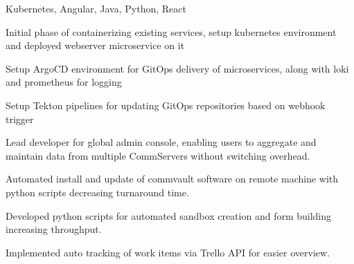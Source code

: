 \documentclass[]{font}
\begin{document}
\begin{minipage}[t]{0.66\textwidth}
Kubernetes, Angular, Java, Python, React
\vspace{\topsep}
\begin{tightemize}
\item Initial phase of containerizing existing services, setup kubernetes environment and deployed webserver microservice on it
\item Setup ArgoCD environment for GitOps delivery of microservices, along with loki and prometheus for logging
\item Setup Tekton pipelines for updating GitOps repositories based on webhook trigger
\item Lead developer for global admin console, enabling users to aggregate and maintain data from multiple CommServers without switching overhead. 
\item Automated install and update of commvault software on remote machine with python scripts decreasing turnaround time.
\item Developed python scripts for automated sandbox creation and form building increasing throughput. 
\item Implemented auto tracking of work items via Trello API for easier overview.
\end{tightemize}    
\sectionsep


\end{minipage}
\end{document}
